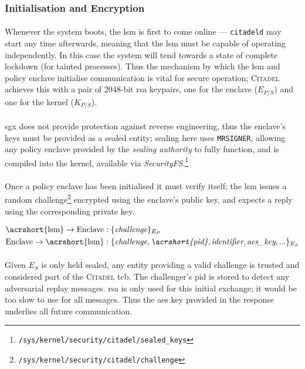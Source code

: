 \subsubsection{Initialisation and Encryption}
\label{sec:initialisation}
\paragraph{} Whenever the system boots, the \acrshort{lsm} is first to come online --- \texttt{citadeld} may start any time afterwards, meaning that the \acrshort{lsm} must be capable of operating independently. In this case the system will tend towards a state of complete lockdown (for tainted processes). Thus the mechanism by which the \acrshort{lsm} and policy enclave initialise communication is vital for secure operation; \textsc{Citadel} achieves this with a pair of 2048-bit \acrshort{rsa} keypairs, one for the enclave ($E_{P/S}$) and one for the kernel ($K_{P/S}$).

\paragraph{} \acrshort{sgx} does not provide protection against reverse engineering, thus the enclave's keys must be provided as a sealed entity; sealing here uses \texttt{MRSIGNER}, allowing any policy enclave provided by the \textit{sealing authority} to fully function, and is compiled into the kernel, available via \textit{SecurityFS}.\footnote{\texttt{/sys/kernel/security/citadel/sealed\_keys}}

\paragraph{} Once a policy enclave has been initialised it must verify itself; the \acrshort{lsm} issues a random challenge\footnote{\texttt{/sys/kernel/security/citadel/challenge}} encrypted using the enclave's public key, and expects a reply using the corresponding private key.

\vspace{-5mm}
\begin{align*}
    \text{\acrshort{lsm}} \rightarrow \text{Enclave} &: \{\textit{challenge}\}_{E_{P}} \\
    \text{Enclave} \rightarrow \text{\acrshort{lsm}} &: \{\textit{challenge}, \textit{\acrshort{pid}}, \textit{identifier}, \textit{aes\_key}, ...\}_{E_{S}}
\end{align*}

\paragraph{} Given $E_S$ is only held sealed, any entity providing a valid challenge is trusted and considered part of the \textsc{Citadel} \acrshort{tcb}. The challenger's \acrshort{pid} is stored to detect any adversarial replay messages. \acrshort{rsa} is only used for this initial exchange; it would be too slow to use for all messages. Thus the \acrshort{aes} key provided in the response underlies all future communication.

